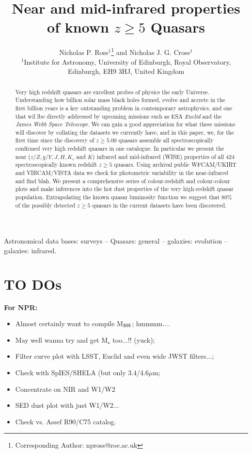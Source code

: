 \documentclass[usenatbib]{mnras}
\begin{document}
\title[Very high-$z$ Quasars]
        {Near and mid-infrared properties of known $z\geq5$ Quasars}
\author[Ross \& Cross]
       {Nicholas P. Ross$^{1}$\thanks{Corresponding Author: npross@roe.ac.uk} and Nicholas J. G. Cross$^{1}$
\\ 
$^1$Institute for Astronomy, University of Edinburgh, Royal Observatory, Edinburgh, EH9 3HJ, United Kingdom\\
}

\maketitle
\begin{abstract}
Very high redshift quasars are excellent probes of physics the early
Universe.  Understanding how billion solar mass black holes
formed, evolve and accrete in the first billion years is a key
outstanding problem in contemporary astrophysics, and one that wil lbe
directly addressed by upcoming missions such as ESA {\it Euclid} and
the {\it James Webb Space Telescope}.
We can gain a good appreciation for what these missions will discover
by collating the datasets we currently have, and in this paper, we,
for the first time since the discovery of $z\geq5.00$ quasars assemble all spectroscopically confirmed very high redshift quasars in
one catalogue.
In particular we present the near ($z/Z, y/Y, J, H, K_{s}$ and $K$)
infrared and mid-infrared (WISE) properties of all 424
spectroscopically known redshift $z\geq5$ quasars.  Using archival public
WFCAM/UKIRT and VIRCAM/VISTA data we check for photometric variability
in the near-infrared and find blah.  We present a comprehensive series
of colour-redshift and colour-colour plots and make inferences into
the hot dust properties of the very high-redshift quasar
population. Extrapolating the known quasar luminosity function we
suggest that 80\% of the possibly detected $z\geq5$ quasars in the
current datasets have been discovered.
\end{abstract}


\begin{keywords}
Astronomical data bases: surveys -- 
Quasars: general -- 
galaxies: evolution -- 
galaxies: infrared.
\end{keywords}

\iffalse
\section*{TO DOs}
{\bf For NPR: }
\begin{itemize}
\item Almost certainly want to compile M$_{\rm BH}$; hmmmm....
\item May well wanna try and get M$_{\star}$ too...!! (yuck); 
\item Filter curve plot with LSST, Euclid and even wide JWST filters...; 
\item Check with SpIES/SHELA (but only 3.4/4.6$\mu$m; 
\item Concentrate on NIR and W1/W2
\item SED dust plot with just W1/W2...
\item Check vs. Assef R90/C75 catalog.
\end{itemize}
\end{document}

